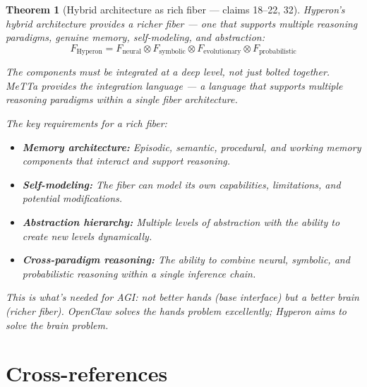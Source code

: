 \documentclass[11pt,a4paper]{article}
\newtheorem{theorem}[definition]{Theorem}
\begin{document}
\begin{theorem}[Hybrid architecture as rich fiber --- claims 18--22, 32]
\label{thm:rich}
Hyperon's hybrid architecture provides a richer fiber --- one that
supports multiple reasoning paradigms, genuine memory, self-modeling,
and abstraction:
\[
  F_{\text{Hyperon}} = F_{\text{neural}} \otimes F_{\text{symbolic}}
  \otimes F_{\text{evolutionary}} \otimes F_{\text{probabilistic}}
\]

The components must be integrated at a deep level, not just bolted
together. MeTTa provides the integration language --- a language that
supports multiple reasoning paradigms within a single fiber architecture.

The key requirements for a rich fiber:
\begin{itemize}
\item \textbf{Memory architecture:} Episodic, semantic, procedural, and
  working memory components that interact and support reasoning.
\item \textbf{Self-modeling:} The fiber can model its own capabilities,
  limitations, and potential modifications.
\item \textbf{Abstraction hierarchy:} Multiple levels of abstraction
  with the ability to create new levels dynamically.
\item \textbf{Cross-paradigm reasoning:} The ability to combine neural,
  symbolic, and probabilistic reasoning within a single inference chain.
\end{itemize}

This is what's needed for AGI: not better hands (base interface) but a
better brain (richer fiber). OpenClaw solves the hands problem excellently;
Hyperon aims to solve the brain problem.
\end{theorem}

\section{Cross-references}
\end{document}
